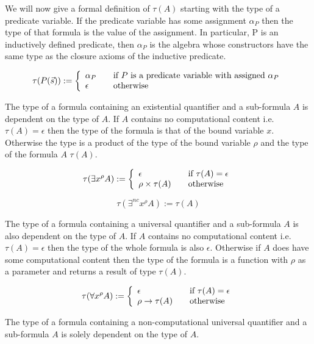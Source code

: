We will now give a formal definition of $\tau (A)$ starting with the type of a
predicate variable. If the predicate variable has some assignment $\alpha_P$ then the type of that
formula is the value of the assignment. In particular, P  is an inductively defined predicate, then $\alpha_P$ is the algebra whose constructors have the same type as the closure axioms of the inductive predicate. 


\[
\tau(P(\vec{s})) := \left\{ 
\begin{array}{l l}
  \alpha_P & \quad \text{if $P$ is a predicate variable with assigned $\alpha_P$}\\
 \epsilon & \quad \text{otherwise}\\
\end{array} \right.
\]

The type of a formula containing an existential quantifier and a sub-formula
$A$ is dependent on the type of $A$. If $A$ contains no computational content
i.e. $\tau(A) = \epsilon$ then the type of the formula is that of the bound
variable $x$. Otherwise the type is a product of the type of the bound
variable $\rho$ and the type of the formula $A$ $\tau (A)$.

\[
\tau(\exists x^{\rho} A) := \left\{ 
\begin{array}{l l}
  \epsilon & \quad \text{if $\tau(A) = \epsilon$}\\
 \rho \times \tau (A) & \quad \text{otherwise}\\
\end{array} \right.
\]

\[
\tau(\exists^{nc} x^{\rho} A) := 
 \tau (A) 
\]

The type of a formula containing a universal quantifier and a sub-formula $A$
is also dependent on the type of $A$. If $A$ contains no computational content
i.e. $\tau (A) = \epsilon$ then the type of the whole formula is also
$\epsilon$. Otherwise if $A$ does have some computational content then the type
of the formula is a function with $\rho$ as a parameter and returns a result
of type $\tau (A)$.


\[
\tau(\forall x^{\rho} A) := \left\{ 
\begin{array}{l l}
  \epsilon & \quad \text{if $\tau(A) = \epsilon$}\\
 \rho \to \tau (A) & \quad \text{otherwise}\\
\end{array} \right.
\]


The type of a formula containing a non-computational universal quantifier and a sub-formula $A$
is solely dependent on the type of $A$.

